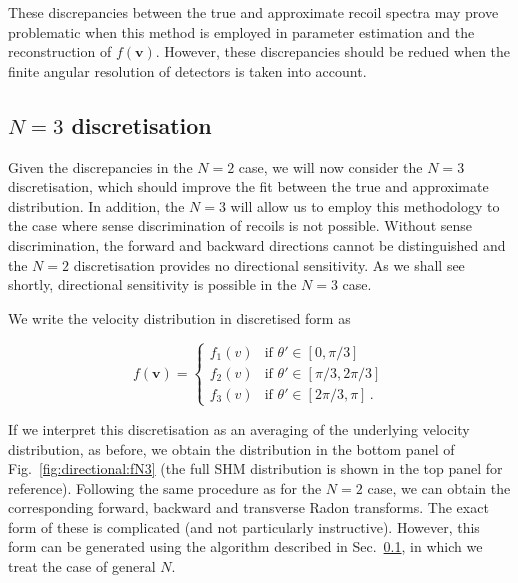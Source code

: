These discrepancies between the true and approximate recoil spectra may prove problematic when this method is employed in parameter estimation and the reconstruction of $f(\textbf{v})$. However, these discrepancies should be redued when the finite angular resolution of detectors is taken into account. 


\subsection{$N=3$ discretisation}

Given the discrepancies in the $N=2$ case, we will now consider the $N=3$ discretisation, which should improve the fit between the true and approximate distribution. In addition, the $N=3$ will allow us to employ this methodology to the case where sense discrimination of recoils is not possible. Without sense discrimination, the forward and backward directions cannot be distinguished and the $N=2$ discretisation provides no directional sensitivity. As we shall see shortly, directional sensitivity is possible in the $N=3$ case.

We write the velocity distribution in discretised form as

\begin{equation}
\label{eq:directional:N3}
f(\mathbf{v}) =
\begin{cases}
f_1(v) & \textrm{if } \theta' \in [0, \pi/3] \\
f_2(v) & \textrm{if } \theta' \in [\pi/3, 2\pi/3] \\
f_3(v) & \textrm{if } \theta' \in [2\pi/3, \pi]\,.
\end{cases}
\end{equation}

If we interpret this discretisation as an averaging of the underlying velocity distribution, as before, we obtain the distribution in the bottom panel of Fig.~\ref{fig:directional:fN3} (the full SHM distribution is shown in the top panel for reference). Following the same procedure as for the $N=2$ case, we can obtain the corresponding forward, backward and transverse Radon transforms. The exact form of these is complicated (and not particularly instructive). However, this form can be generated using the algorithm described in Sec.~\ref{}, in which we treat the case of general $N$. 

